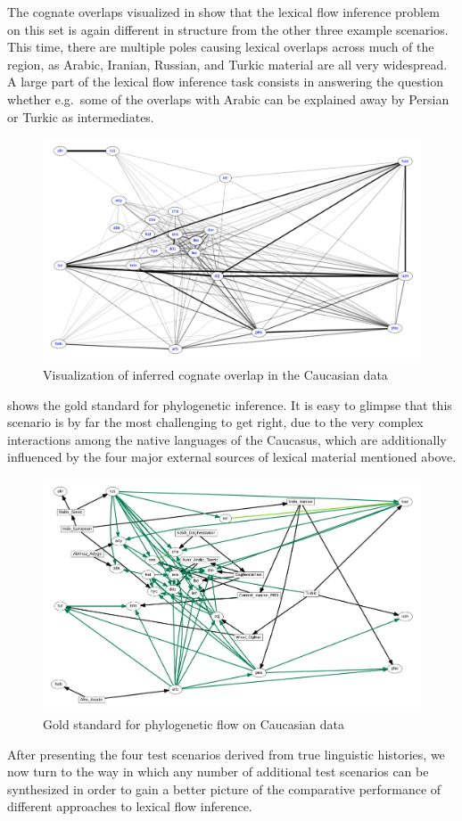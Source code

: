 The cognate overlaps visualized in  show that the lexical flow inference problem on this set is again different in structure from the other three example scenarios. This time, there are multiple poles causing lexical overlaps across much of the region, as Arabic, Iranian, Russian, and Turkic material are all very widespread. A large part of the lexical flow inference task consists in answering the question whether e.g.\ some of the overlaps with Arabic can be explained away by Persian or Turkic as intermediates.

\begin{figure}
\includegraphics[width=\textwidth]{figures/cognacy-strength-caucasus.pdf}
\caption{Visualization of inferred cognate overlap in the Caucasian data}
\label{caucasus-cognacy}
\end{figure}

 shows the gold standard for phylogenetic inference. It is easy to glimpse that this scenario is by far the most challenging to get right, due to the very complex interactions among the native languages of the Caucasus, which are additionally influenced by the four major external sources of lexical material mentioned above.

\begin{figure}
\includegraphics[width=\textwidth]{figures/goldstandard-phylo-caucasus.pdf}
\caption{Gold standard for phylogenetic flow on Caucasian data}
\label{caucasus-goldstandard-phylo}
\end{figure}

After presenting the four test scenarios derived from true linguistic histories, we now turn to the way in which any number of additional test scenarios can be synthesized in order to gain a better picture of the comparative performance of different approaches to lexical flow inference.
